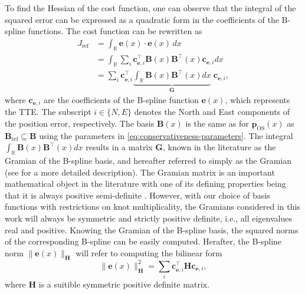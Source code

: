 To find the Hessian of the cost function, one can observe that the integral of the squared error can be expressed as a quadratic form in the coefficients of the B-spline functions. The cost function can be rewritten as
\begin{equation}
    \begin{aligned}
        J_\text{ref} &= \int_\mathbb R \mathbf e(x) \cdot \mathbf e(x) \, dx \\
        &= \int_\mathbb R \sum_i \mathbf c_{\mathbf e,i}^\top \mathbf B(x) \mathbf B^\top(x) \mathbf c_{\mathbf e,i}  dx \\
        &= \sum_i \mathbf c_{\mathbf e,i}^\top \underbrace{\int_\mathbb R \mathbf B(x) \mathbf B^\top(x) dx}_{\mathbf G} \;\mathbf c_{\mathbf e,i},
    \end{aligned}
\end{equation}
where $\mathbf c_{\mathbf e,i}$ are the coefficients of the B-spline function $\mathbf e(x)$, which represents the TTE. The subscript $i\in\{N,E\}$ denotes the North and East components of the position error, respectively.
The basis $\mathbf B(x)$ is the same as for $\mathbf p_\text{OS}(x)$ as $\mathbf B_\text{ref} \subseteq \mathbf B$ using the parameters in \cref{eq:conservativeness-parameters}. 
The integral $\int_\mathbb R \mathbf B(x) \mathbf B^\top(x) dx$ results in a matrix $\mathbf G$, known in the literature as the Gramian of the B-spline basis, and hereafter referred to simply as the Gramian (see \citet{Chu2022} for a more detailed description).
The Gramian matrix is an important mathematical object in the literature with one of its defining properties being that it is always positive semi-definite \citep{horn2013positive}. However, with our choice of basis functions with restrictions on knot multiplicality, the Gramians considered in this work will always be symmetric and strictly positive definite, i.e., all eigenvalues real and positive. Knowing the Gramian of the B-spline basis, the squared norms of the corresponding B-spline can be easily computed. Herafter, the B-spline norm $\|\mathbf e(x)\|_\mathbf H$ will refer to computing the bilinear form
\begin{equation}\label{eq:b-spline-norm}
    \|\mathbf e(x)\|_\mathbf H^2 = \sum_i \mathbf c_{\mathbf e,i}^\top \mathbf H \mathbf c_{\mathbf e,i},
\end{equation}
where $\mathbf H$ is a suitible symmetric positive definite matrix. 


